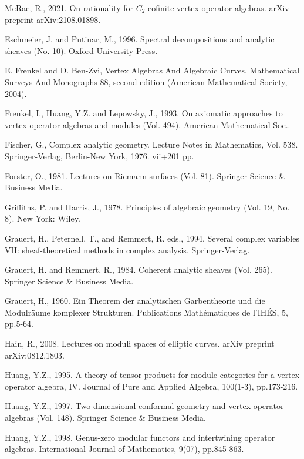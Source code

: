 \documentclass[12pt,a4paper,notitlepage]{report}
\theoremstyle{definition}
\theoremstyle{plain}
\numberwithin{equation}{section}
\begin{document}
\begin{thebibliography}{999999}
McRae, R., 2021. On rationality for $C_2$-cofinite vertex operator algebras. arXiv preprint arXiv:2108.01898.

Eschmeier, J. and Putinar, M., 1996. Spectral decompositions and analytic sheaves (No. 10). Oxford University Press.

E. Frenkel and D. Ben-Zvi, Vertex Algebras And Algebraic Curves, Mathematical Surveys And Monographs 88, second edition (American Mathematical Society, 2004).

Frenkel, I., Huang, Y.Z. and Lepowsky, J., 1993. On axiomatic approaches to vertex operator algebras and modules (Vol. 494). American Mathematical Soc..

Fischer, G., Complex analytic geometry. Lecture Notes in Mathematics, Vol. 538. Springer-Verlag, Berlin-New York, 1976. vii+201 pp.


Forster, O., 1981. Lectures on Riemann surfaces (Vol. 81). Springer Science \& Business Media.

Griffiths, P. and Harris, J., 1978. Principles of algebraic geometry (Vol. 19, No. 8). New York: Wiley.

Grauert, H., Peternell, T., and Remmert, R. eds., 1994. Several complex variables VII: sheaf-theoretical methods in complex analysis. Springer-Verlag.

Grauert, H. and Remmert, R., 1984. Coherent analytic sheaves (Vol. 265). Springer Science \& Business Media.

Grauert, H., 1960. Ein Theorem der analytischen Garbentheorie und die Modulr\"aume komplexer Strukturen. Publications Math\'ematiques de l'IH\'ES, 5, pp.5-64.

Hain, R., 2008. Lectures on moduli spaces of elliptic curves. arXiv preprint arXiv:0812.1803.

Huang, Y.Z., 1995. A theory of tensor products for module categories for a vertex operator algebra, IV. Journal of Pure and Applied Algebra, 100(1-3), pp.173-216.	

Huang, Y.Z., 1997. Two-dimensional conformal geometry and vertex operator algebras (Vol. 148). Springer Science \& Business Media.

Huang, Y.Z., 1998. Genus-zero modular functors and intertwining operator algebras. International Journal of Mathematics, 9(07), pp.845-863.		


\end{thebibliography}
\end{document}
